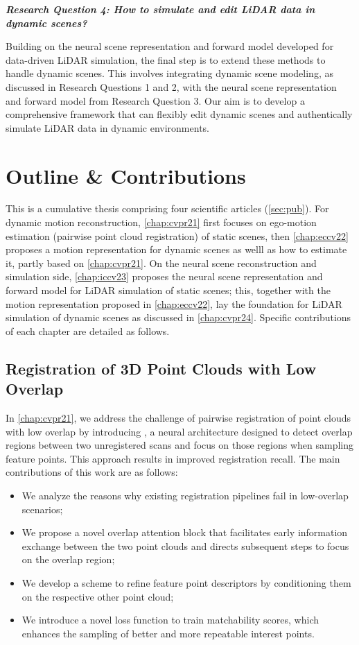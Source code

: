 \noindent
\textbf{\textit{Research Question 4: How to simulate and edit LiDAR data in dynamic scenes?}}

Building on the neural scene representation and forward model developed for data-driven LiDAR simulation, the final step is to extend these methods to handle dynamic scenes. This involves integrating dynamic scene modeling, as discussed in Research Questions 1 and 2, with the neural scene representation and forward model from Research Question 3. Our aim is to develop a comprehensive framework that can flexibly edit dynamic scenes and authentically simulate LiDAR data in dynamic environments.

\section{Outline \& Contributions} 
This is a cumulative thesis comprising four scientific articles (\cf \cref{sec:pub}). For dynamic motion reconstruction, \cref{chap:cvpr21} first focuses on ego-motion estimation (pairwise point cloud registration) of static scenes, then \cref{chap:eccv22} proposes a motion representation for dynamic scenes as welll as how to estimate it, partly based on \cref{chap:cvpr21}. On the neural scene reconstruction and simulation side, \cref{chap:iccv23} proposes the neural scene representation and forward model for LiDAR simulation of static scenes; this, together with the motion representation proposed in \cref{chap:eccv22}, lay the foundation for LiDAR simulation of dynamic scenes as discussed in \cref{chap:cvpr24}. Speciﬁc contributions of each chapter are detailed as follows.

\subsection{Registration of 3D Point Clouds with Low Overlap}
In \cref{chap:cvpr21}, we address the challenge of pairwise registration of point clouds with low overlap by introducing \acro, a neural architecture designed to detect overlap regions between two unregistered scans and focus on those regions when sampling feature points. This approach results in improved registration recall. The main contributions of this work are as follows:

\begin{itemize}
\item We analyze the reasons why existing registration pipelines fail in low-overlap scenarios;
\item We propose a novel overlap attention block that facilitates early information exchange between the two point clouds and directs subsequent steps to focus on the overlap region;
\item We develop a scheme to refine feature point descriptors by conditioning them on the respective other point cloud;
\item We introduce a novel loss function to train matchability scores, which enhances the sampling of better and more repeatable interest points.
\end{itemize}

